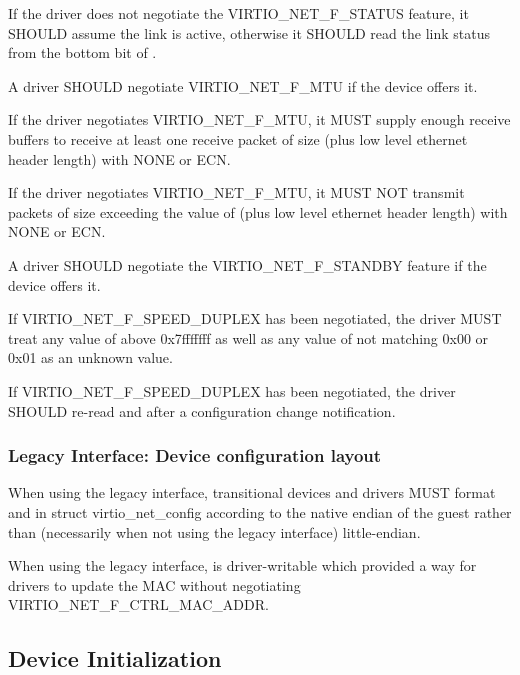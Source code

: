 If the driver does not negotiate the VIRTIO_NET_F_STATUS feature, it SHOULD
assume the link is active, otherwise it SHOULD read the link status from
the bottom bit of .

A driver SHOULD negotiate VIRTIO_NET_F_MTU if the device offers it.

If the driver negotiates VIRTIO_NET_F_MTU, it MUST supply enough receive
buffers to receive at least one receive packet of size  (plus low
level ethernet header length) with  NONE or ECN.

If the driver negotiates VIRTIO_NET_F_MTU, it MUST NOT transmit packets of
size exceeding the value of  (plus low level ethernet header length)
with  NONE or ECN.

A driver SHOULD negotiate the VIRTIO_NET_F_STANDBY feature if the device offers it.

If VIRTIO_NET_F_SPEED_DUPLEX has been negotiated,
the driver MUST treat any value of  above
0x7fffffff as well as any value of  not
matching 0x00 or 0x01 as an unknown value.

If VIRTIO_NET_F_SPEED_DUPLEX has been negotiated, the driver
SHOULD re-read  and  after a
configuration change notification.

\subsubsection{Legacy Interface: Device configuration layout}\label{sec:Device Types / Network Device / Device configuration layout / Legacy Interface: Device configuration layout}
\label{sec:Device Types / Block Device / Feature bits / Device configuration layout / Legacy Interface: Device configuration layout}
When using the legacy interface, transitional devices and drivers
MUST format  and
 in struct virtio_net_config
according to the native endian of the guest rather than
(necessarily when not using the legacy interface) little-endian.

When using the legacy interface,  is driver-writable
which provided a way for drivers to update the MAC without
negotiating VIRTIO_NET_F_CTRL_MAC_ADDR.

\subsection{Device Initialization}\label{sec:Device Types / Network Device / Device Initialization}

